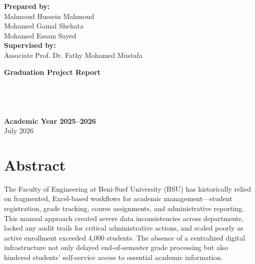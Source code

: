 \begin{titlepage}
    {\Large \textbf{Prepared by:}}\\[0.3cm]
    {\large Mahmoud Hussein Mahmoud}\\
    {\large Mohamed Gamal Shehata}\\
    {\large Mohamed Essam Sayed}\\[1cm]
    
    {\Large \textbf{Supervised by:}}\\[0.3cm]
    {\large Associate Prof. Dr. Fathy Mohamed Mustafa}
    
    \vspace{2cm}
    
    {\Large \textbf{Graduation Project Report}}\\[0.5cm]
    \\[0.2cm]
    \\[0.2cm]
    \\[0.2cm]
    \\[1.5cm]
    
    {\Large \textbf{Academic Year 2025--2026}}\\[0.3cm]
    {\large July 2026}
    
\end{titlepage}


\chapter*{Abstract}
\label{chap:abstract}

The Faculty of Engineering at Beni-Suef University (BSU) has historically relied on fragmented, Excel-based workflows for academic management---student registration, grade tracking, course assignments, and administrative reporting. This manual approach created severe data inconsistencies across departments, lacked any audit trails for critical administrative actions, and scaled poorly as active enrollment exceeded 4,000 students. The absence of a centralized digital infrastructure not only delayed end-of-semester grade processing but also hindered students' self-service access to essential academic information.


